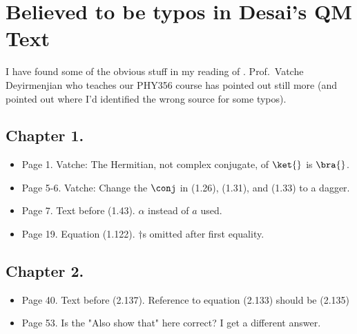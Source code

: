 


\chapter{Believed to be typos in Desai's QM Text}

\beginArtNoToc

I have found some of the obvious stuff in my reading of \cite{desai2009quantum}.  Prof.\ Vatche Deyirmenjian who teaches our PHY356 course has pointed out still more (and pointed out where I'd identified the wrong source for some typos).

\section{Chapter 1.}

\begin{itemize}
\item Page 1.  Vatche: The Hermitian, not complex conjugate, of $\ket{}$ is $\bra{}$.
\item Page 5-6.  Vatche: Change the $\conj$ in (1.26), (1.31), and (1.33) to a dagger.
\item Page 7.  Text before (1.43).  $\alpha$ instead of $a$ used.
\item Page 19.  Equation (1.122).  $\dagger$s omitted after first equality.
\end{itemize}

\section{Chapter 2.}
\begin{itemize}
\item Page 40.  Text before (2.137).  Reference to equation (2.133) should be (2.135)
\item Page 53.  Is the "Also show that" here correct?  I get a different answer.
\end{itemize}

